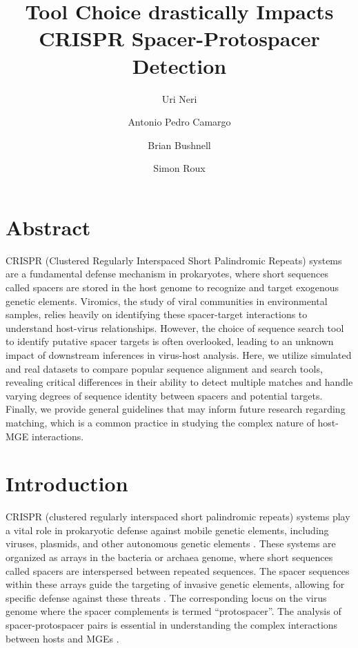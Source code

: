 \documentclass[
]{article}
\title{Tool Choice drastically Impacts CRISPR Spacer-Protospacer
Detection}
\author{Uri Neri \and Antonio Pedro Camargo \and Brian
Bushnell \and Simon Roux}
\date{}
\begin{document}
\maketitle


\section{Abstract}\label{sec-abstract}

CRISPR (Clustered Regularly Interspaced Short Palindromic Repeats)
systems are a fundamental defense mechanism in prokaryotes, where short
sequences called spacers are stored in the host genome to recognize and
target exogenous genetic elements. Viromics, the study of viral
communities in environmental samples, relies heavily on identifying
these spacer-target interactions to understand host-virus relationships.
However, the choice of sequence search tool to identify putative spacer
targets is often overlooked, leading to an unknown impact of downstream
inferences in virus-host analysis. Here, we utilize simulated and real
datasets to compare popular sequence alignment and search tools,
revealing critical differences in their ability to detect multiple
matches and handle varying degrees of sequence identity between spacers
and potential targets. Finally, we provide general guidelines that may
inform future research regarding matching, which is a common practice in
studying the complex nature of host-MGE interactions.

\section{Introduction}\label{sec-introduction}

CRISPR (clustered regularly interspaced short palindromic repeats)
systems play a vital role in prokaryotic defense against mobile genetic
elements, including viruses, plasmids, and other autonomous genetic
elements \autocite{Mojica_2005,CRISPR_review}. These systems are
organized as arrays in the bacteria or archaea genome, where short
sequences called spacers are interspersed between repeated sequences.
The spacer sequences within these arrays guide the targeting of invasive
genetic elements, allowing for specific defense against these threats
\autocite{CRISPR_classification}. The corresponding locus on the virus
genome where the spacer complements is termed ``protospacer''. The
analysis of spacer-protospacer pairs is essential in understanding the
complex interactions between hosts and MGEs
\autocite{Edwards2015_phage_host}.
\end{document}
